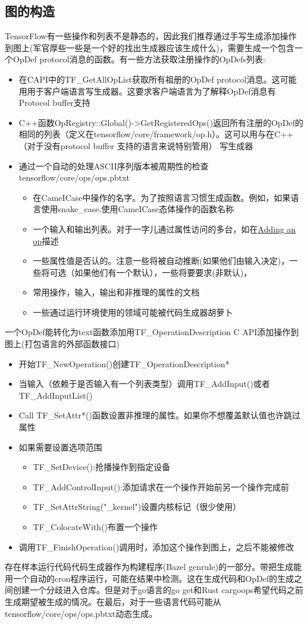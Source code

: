 \subsection{图的构造}
TensorFlow有一些操作和列表不是静态的，因此我们推荐通过手写生成添加操作到图上(军官厚些一些是一个好的找出生成器应该生成什么)，需要生成一个包含一个OpDef protocol消息的函数。有一些方法获取注册操作的OpDefs列表:
\begin{itemize}
\item 在CAPI中的TF\_GetAllOpList获取所有祖册的OpDef protocol消息。这可能用用于客户端语言写生成器。这要求客户端语言为了解释OpDef消息有Protocol buffer支持
\item  C++函数OpRegistry::Global()->GetRegisteredOps()返回所有注册的OpDef的相同的列表（定义在tensorflow/core/framework/op.h）。这可以用与在C++（对于没有protocol buffer 支持的语言来说特别管用）
写生成器
\item 通过一个自动的处理ASCII序列版本被周期性的检查tensorflow/core/ops/ops.pbtxt
\begin{itemize}
\item 在CameICase中操作的名字。为了按照语言习惯生成函数。例如，如果语言使用snake\_case,使用CameICase态体操作的函数名称
\item 一个输入和输出列表。对于一字儿通过属性访问的多台，如在\href{https://www.tensorflow.org/extend/adding_an_op}{Adding an op}描述
\item 一些属性值是否认的。注意一些将被自动推断(如果他们由输入决定)，一些将可选（如果他们有一个默认），一些将要要求(非默认)，
\item 常用操作，输入，输出和非推理的属性的文档
\item 一些通过运行环境使用的领域可能被代码生成器胡萝卜
\end{itemize}
\end{itemize}
一个OpDef能转化为text函数添加用TF\_OperationDescription C API添加操作到图上(打包语言的外部函数接口)
\begin{itemize}
\item 开始TF\_NewOperation()创建TF\_OperationDescription*
\item 当输入（依赖于是否输入有一个列表类型）调用TF\_AddInput()或者TF\_AddInputList()
\item Call TF\_SetAttr*()函数设置非推理的属性。如果你不想覆盖默认值也许跳过属性
\item 如果需要设置选项范围
\begin{itemize}
\item TF\_SetDevice():抢播操作到指定设备
\item TF\_AddControlInput():添加请求在一个操作开始前另一个操作完成前
\item TF\_SetAttrString("\_kernel")设置内核标记（很少使用）
\item TF\_ColocateWith()布置一个操作
\end{itemize}
\item 调用TF\_FinishOperation()调用时，添加这个操作到图上，之后不能被修改
\end{itemize}
存在样本运行代码代码生成器作为构建程序(Bazel genrule)的一部分。带把生成能用一个自动的cron程序运行，可能在结果中检测。这在生成代码和OpDef的生成之间创建一个分歧进入仓库。但是对于go语言的go get和Rust cargoops希望代码之前生成期望被生成的情况。在最后，对于一些语言代码可能从tensorflow/core/ops/ops.pbtxt动态生成。
